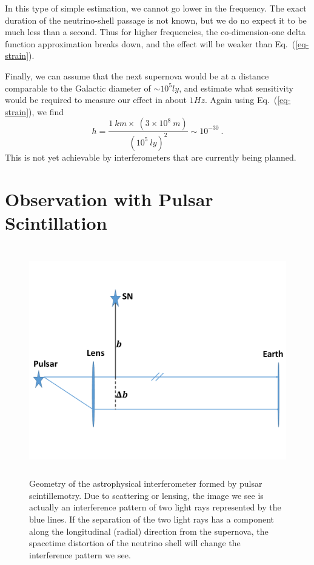 \documentclass[aps,showpacs,twocolumn,floats,prd,superscriptaddress,nofootinbib]{revtex4-1}
\begin{document}
In this type of simple estimation, we cannot go lower in the frequency. The exact duration of the neutrino-shell passage is not known, but we do no expect it to be much less than a second. Thus for higher frequencies, the co-dimension-one delta function approximation breaks down, and the effect will be weaker than Eq.~(\ref{eq-strain}).

Finally, we can assume that the next supernova would be at a distance comparable to the Galactic diameter of $\sim 10^5 ly$, and estimate what sensitivity would be required to measure our effect in about $1 Hz$. Again using Eq.~(\ref{eq-strain}), we find
\begin{equation}
	h = \frac{ 1~km \times ~ (3\times10^8~m)}{(10^5~ly)^2}\sim 10^{-30}~.
\end{equation}
This is not yet achievable by interferometers that are currently being planned. 

\section{Observation with Pulsar Scintillation}
\label{sec-scint}

\onecolumngrid

\begin{figure}[tb]
\begin{center}
\includegraphics[width=\textwidth,height=10cm]{Lens.pdf}
\caption{Geometry of the astrophysical interferometer formed by pulsar scintillemotry. Due to scattering or lensing, the image we see is actually an interference pattern of two light rays represented by the blue lines. If the separation of the two light rays has a component along the longitudinal (radial) direction from the supernova, the spacetime distortion of the neutrino shell will change the interference pattern we see.}
\label{fig:4}
\end{center}
\end{figure}
\end{document}
